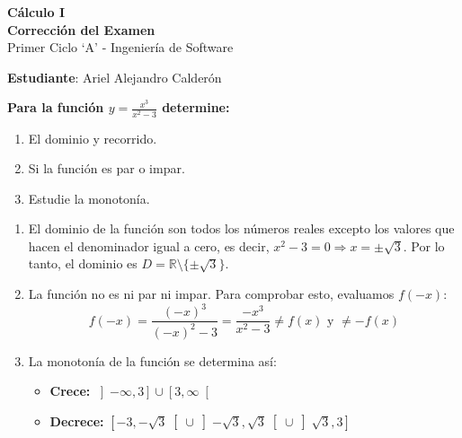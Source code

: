 \documentclass[answers]{exam} %
\begin{document}
\begin{center}
	\Large\textbf{Cálculo I}\\[1em]
	\large\textbf{Corrección del Examen}\\[1em]
	\large Primer Ciclo \enquote*{A} - Ingeniería de Software\\[1em]
\end{center}

\vspace{0.5cm}
\large\textbf{Estudiante}: Ariel Alejandro Calderón
\vspace{0.5cm}

\begin{questions}

	\question \large\textbf{Para la función $\displaystyle y = \frac{x^3}{x^2 - 3} $ determine:}
	\begin{enumerate}[label=\alph*.]
		\item El dominio y recorrido.
		\item Si la función es par o impar.
		\item Estudie la monotonía.
	\end{enumerate}
	\begin{solution}
		\begin{enumerate}[label=\alph*.]
			\item El dominio de la función son todos los números reales excepto los valores que hacen el denominador igual a cero, es decir, $x^2 - 3 = 0 \Rightarrow x = \pm\sqrt{3}$. Por lo tanto, el dominio es $D = \mathbb{R} \setminus \{\pm\sqrt{3}\}$.

			\item La función no es ni par ni impar. Para comprobar esto, evaluamos $f(-x)$:
			      \[
				      f(-x) = \frac{(-x)^3}{(-x)^2 - 3} = \frac{-x^3}{x^2 - 3} \neq f(x) \text{ y } \neq -f(x)
			      \]

			\item La monotonía de la función se determina así:
			      \begin{itemize}
				      \item \normalsize\textbf{Crece:} $\displaystyle \left]-\infty, 3\right]\cup \left[3, \infty\right[$
				      \item \normalsize\textbf{Decrece:} $\displaystyle \left[-3, -\sqrt{3}\right[\cup \left]-\sqrt{3}, \sqrt{3}\right[\cup \left]\sqrt{3}, 3\right]$
			      \end{itemize}
		\end{enumerate}


\end{solution}
\end{questions}
\end{document}
